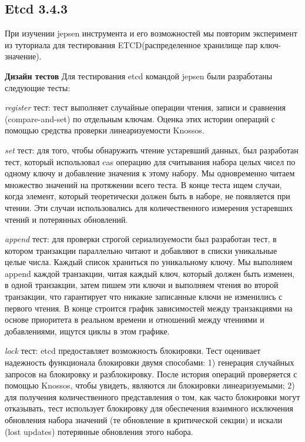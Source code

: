 \documentclass[12pt,  openany]{book}
\begin{document}
\subsection{Etcd 3.4.3 \cite{etcdAnalyses} \cite{etcdTutorial}}
При изучении jepsen инструмента и его возможностей мы повторим эксперимент из туториала для тестирования ETCD(распределенное хранилище пар ключ-значение).
\par
\textbf{Дизайн тестов} \newline
Для тестирования etcd командой jepsen были разработаны следующие тесты: \par
\textit{register} тест:  тест выполняет случайные операции чтения, записи и сравнения (compare-and-set) по отдельным ключам. Оценка этих истории операций с помощью средства проверки линеаризуемости Knossos. \par
\textit{set} тест:  для того, чтобы обнаружить чтение устаревший данных, был разработан тест, который использовал cas  операцию для считывания набора целых чисел по одному ключу и добавление значения к этому набору. Мы одновременно читаем множество значений на протяжении всего теста. В конце теста ищем случаи, когда элемент, который теоретически должен быть в наборе, не появляется при чтении. Эти случаи использовались для количественного измерения устаревших чтений и потерянных обновлений. \par
\textit{append} тест: для проверки строгой сериализуемости был разработан тест, в котором транзакции параллельно читают и добавляют в списки уникальные целые числа. Каждый список храниться по уникальному ключу.  Мы выполняем append каждой транзакции, читая каждый ключ, который должен быть изменен, в одной транзакции, затем пишем эти ключи и выполняем чтения во второй транзакции, что гарантирует что никакие записанные ключи не изменились с первого чтения. В конце строится график зависимостей между транзакциями на основе приоритета в реальном времени и отношений между чтениями и добавлениями, ищутся циклы в этом графике. \par
\textit{lock} тест: etcd предоставляет возможность блокировки. Тест оценивает надежность функционала блокировки двумя способами: 1) генерация случайных запросов на блокировку и разблокировку. После история операций проверяется с помощью Knossos, чтобы увидеть, являются ли блокировки линеаризуемыми; 2) для получения количественного представления о том, как часто блокировки могут отказывать, тест использует блокировку для обеспечения взаимного исключения обновления набора значений (те обновление в критической секции) и искали (lost updates) потерянные обновления этого набора. \par
\end{document}

